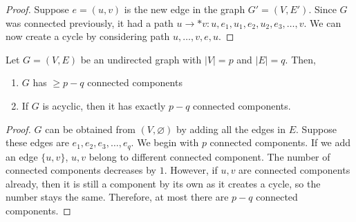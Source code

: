 \documentclass[a4paper]{article}
\theoremstyle{plain}
\newtheorem{thm}{Theorem}[section]
\theoremstyle{definition}
\theoremstyle{remark}
\begin{document}
\begin{tcolorbox}[colback=black!3!white,colframe=black!60!white,title=\begin{thm}Adding a new edge to same vertices creates a cycle \label{Adding a new edge to same vertices creates a cycle}\end{thm}]
	\begin{proof}
		Suppose $e=(u,v)$ is the new edge in the graph $G' = (V,E')$. Since $G$ was connected previously, it had a path $u \to *v: u,e_1, u_1,e_2, u_2,e_3, \ldots, v$. We can now create a cycle by considering path $u,\ldots,v,e,u$.
	\end{proof}	
\end{tcolorbox}
\begin{tcolorbox}[colback=black!3!white,colframe=black!60!white,title=\begin{thm}Theorem 3 \label{Theorem 3}\end{thm}]
Let $G=(V,E)$ be an undirected graph with $|V| = p$ and $|E| = q$. Then,
\begin{enumerate}
	\item $G$ has $\ge p-q$ connected components
	\item If $G$ is acyclic, then it has exactly $p-q$ connected components. 
\end{enumerate}
\begin{proof}
	$G$ can be obtained from $(V,\varnothing)$ by adding all the edges in $E$. Suppose these edges are $e_1,e_2,e_3,\ldots,e_q$. We begin with $p$ connected components. If we add an edge $\{ u,v \}$, $u,v$ belong to different connected component. The number of connected components decreases by $1$. However, if $u,v$ are connected components already, then it is still a component by its own as it creates a cycle, so the number stays the same. Therefore, at most there are $p-q$ connected components.
\end{proof}
\end{tcolorbox}
\end{document}
